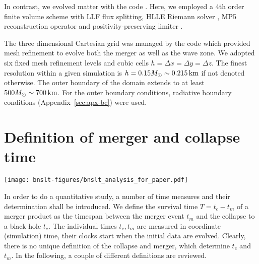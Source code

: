 In contrast, we evolved matter with the  code 
\cite{Radice2012a, Radice2013b, Radice2013c}. Here, we employed a 4th order 
finite volume scheme with LLF flux splitting, HLLE Riemann solver 
\cite{Harten83}, MP5 reconstruction operator \cite{suresh_1997_amp} and 
positivity-preserving limiter \cite{Hu2013}.

The three dimensional Cartesian grid was managed by the
 code \cite{Schnetter-etal-03b, Schnetter:2006pg, 
Goodale02a} 
which provided mesh refinement to evolve both the merger as well as the wave 
zone. We adopted six fixed mesh refinement levels and cubic 
cells $h=\Delta x=\Delta y=\Delta z$. The finest resolution within a given 
simulation is $h=0.15M_{\odot} \sim 0.215 \,{\mathrm{km}}$ if not denoted otherwise. The outer 
boundary of the domain extends to at least $500 M_{\odot} \sim 700 \,{\mathrm{km}}$.
For the outer boundary conditions, radiative boundary conditions
(Appendix~\ref{sec:apx-bc}) were used.



\section{Definition of merger and collapse time}
\begin{marginfigure}
	\hspace*{-.6cm}
	\texttt{[image: bnslt-figures/bnslt\_analysis\_for\_paper.pdf]}
	\caption[
	    Cartoon for the different time definitions for BNS, \exclusive
	]{
		Cartoon for demonstrating the definition and extraction of the 
		\emph{survival time} of a merger remnant.
		The red line compares the merger time determination in three different
		ways, from top to bottom: Seperation $d$, Gravitational wave strain
		(polarization $h_+$ dashed, envelope $h$ solid), global lapse $\alpha$
		minimum.
		The green line shows the merger time, indicated by the lapse.
		\\ This example shows an equal mass binary
		$M=1.55 M_\tov$ for the BHB-$\Lambda\Phi$ equation of state.
	}\label{fig:analsyis-example}
\end{marginfigure}

In order to do a quantitative study, a number of time measures and their
determination shall be introduced.
We define the survival time $T=t_c - t_m$ of a merger product as the
timespan between the merger event $t_m$ and the collapse to a black hole $t_c$.
The individual times $t_c, t_m$ are measured in coordinate (simulation) time,
\ie their clocks start when the initial data are evolved. Clearly, there is
no unique definition of the collapse and merger, which determine $t_c$ and $t_m$.
In the following, a couple of different definitions are reviewed.

